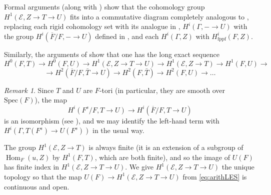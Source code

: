 \documentclass{amsart}
\theoremstyle{definition}
\theoremstyle{remark}
\newtheorem{remark}[result]{Remark}
\DeclareMathOperator\Hom{Hom}
\newcommand\Spec{\mathrm{Spec}}
\newcommand{\ov}{\overline}
\begin{document}
Formal arguments (along with \cite[Proposition 3.10]{Dillery1}) show that the cohomology group $H^{1}(\mathcal{E}, Z \to T \to U)$ fits into a commutative diagram completely analogous to \cite[(5.1)]{Kal26b}, replacing each rigid cohomology set with its analogue in \cite{Dillery1}, $H^{i}(\Gamma, - \to U)$ with the group $H^{i}(\ov{F}/F, - \to U)$ defined in \cite[\S A.1]{Dillery23b}, and each $H^{i}(\Gamma,Z)$ with $H^{i}_{\text{fppf}}(F,Z)$. 

Similarly, the arguments of \cite[\S A.1]{Dillery23b} show  that one has the long exact sequence
\begin{equation*}
 H^{0}(F,T) \to H^{0}(F,U) \to H^{1}(\mathcal{E}, Z \to T \to U) \to H^{1}(\mathcal{E}, Z \to T) \to H^{1}(F,U) \to
\end{equation*}
\begin{equation}\label{eq:arithLES}
    \to H^{2}(\ov{F}/F, \bar{T} \to U) \to H^{2}(F,\bar{T}) \to H^{2}(F,U) \to \dots
\end{equation}


\begin{remark}
    Since $T$ and $U$ are $F$-tori (in particular, they are smooth over $\Spec(F)$), the map
    \begin{equation*}
        H^{i}(F^{s}/F, T \to U) \to H^{i}(\ov{F}/F, T \to U)
    \end{equation*}
    is an isomorphism (see \cite[Lemma A.1]{Dillery23b}), and we may identify the left-hand term with $H^{i}(\Gamma, T(F^{s}) \to U(F^{s}))$ in the usual way.
\end{remark}

The group $H^{1}(\mathcal{E}, Z \to T)$ is always finite (it is an extension of a subgroup of $\Hom_{F}(u,Z)$ by $H^{1}(F,T)$, which are both finite), and so the image of $U(F)$ has finite index in $H^{1}(\mathcal{E}, Z \to T \to U)$. We give $H^{1}(\mathcal{E}, Z \to T \to U)$ the unique topology so that the map $U(F) \to H^{1}(\mathcal{E}, Z \to T \to U)$ from \eqref{eq:arithLES} is continuous and open.
\end{document}
